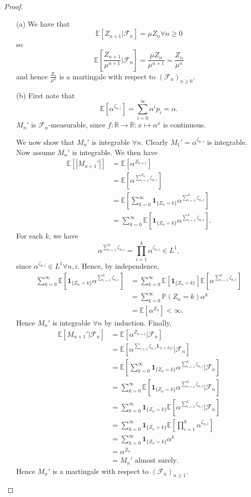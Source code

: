 \documentclass{article}
\begin{document}
\begin{proof}
\begin{enumerate}
    \item[(a)] We have that \[\mathbb{E}[Z_{n+1}|\mathcal{F}_n]=\mu Z_n\forall n\geq 0\] so \[\mathbb{E}\left[\frac{Z_{n+1}}{\mu^{n+1}}|\mathcal{F}_n\right]=\frac{\mu Z_n}{\mu^{n+1}}=\frac{Z_n}{\mu^n}\] and hence $\frac{Z_n}{\mu^n}$ is a martingale with respect to $(\mathcal{F}_n)_{n\geq0}$.
    \item[(b)] First note that \[\mathbb{E}[\alpha^{\zeta_{n,i}}]=\sum_{i=0}^\infty\alpha^ip_i=\alpha.\]$M_n'$ is $\mathcal{F}_n$-measurable, since $f:\mathbb{R}\to\mathbb{R}:x\mapsto\alpha^x$ is continuous.
    
    We now show that $M_n'$ is integrable $\forall n$. Clearly $M_1'=\alpha^{\zeta_{0,1}}$ is integrable. Now assume $M_n'$ is integrable. We then have
    \begin{align*}\mathbb{E}[|M_{n+1}'|]&=\mathbb{E}[\alpha^{Z_{n+1}}]\\&=\mathbb{E}[\alpha^{\sum_{i=1}^{Z_n}\zeta_{n,i}}]\\&=\mathbb{E}[\sum_{k=0}^\infty\mathbf{1}_{\{Z_n=k\}}\alpha^{\sum_{i=1}^k\zeta_{n,i}}]\\&=\sum_{k=0}^\infty\mathbb{E}[\mathbf{1}_{\{Z_n=k\}}\alpha^{\sum_{i=1}^k\zeta_{n,i}}].\end{align*} For each $k$, we have\[\alpha^{\sum_{i=1}^k\zeta_{n,i}}=\prod_{i=1}^k\alpha^{\zeta_{n,i}}\in L^1,\] since $\alpha^{\zeta_{n,i}}\in L^1\forall n,i$. Hence, by independence,\begin{align*}
    \sum_{k=0}^\infty\mathbb{E}[\mathbf{1}_{\{Z_n=k\}}\alpha^{\sum_{i=1}^k\zeta_{n,i}}]&=\sum_{k=0}^\infty\mathbb{E}[\mathbf{1}_{\{Z_n=k\}}]\mathbb{E}[\alpha^{\sum_{i=1}^k\zeta_{n,i}}]\\&=\sum_{k=0}^\infty\mathbb{P}(Z_n=k)\alpha^k\\&=\mathbb{E}[\alpha^{Z_n}]<\infty.
    \end{align*} Hence $M_n'$ is integrable $\forall n$ by induction.
    Finally,\begin{align*}\mathbb{E}[M_{n+1}'|\mathcal{F}_n]&=\mathbb{E}[\alpha^{Z_{n+1}}|\mathcal{F}_n]\\&=\mathbb{E}[\alpha^{\sum_{i\geq1}\zeta_{n,i}\mathbf{1}_{\{i\leq Z_n\}}}|\mathcal{F}_n]\\&=\mathbb{E}\left[\sum_{k=0}^\infty\mathbf{1}_{\{Z_n=k\}}\alpha^{\sum_{i=1}^k\zeta_{n,i}}|\mathcal{F}_n\right]\\&=\sum_{k=0}^\infty\mathbb{E}[\mathbf{1}_{\{Z_n=k\}}\alpha^{\sum_{i=1}^k\zeta_{n,i}}|\mathcal{F}_n]\\&=\sum_{k=0}^\infty\mathbf{1}_{\{Z_n=k\}}\mathbb{E}[\alpha^{\sum_{i=1}^k\zeta_{n,i}}|\mathcal{F}_n]\\&=\sum_{k=0}^\infty\mathbf{1}_{\{Z_n=k\}}\mathbb{E}[\prod_{i=1}^k\alpha^{\zeta_{n,i}}]\\&=\sum_{k=0}^\infty\mathbf{1}_{\{Z_n=k\}}\alpha^k\\&=\alpha^{Z_n}\\&=M_n'\text{ almost surely.}\end{align*}Hence $M_n'$ is a martingale with respect to $(\mathcal{F}_n)_{n\geq1}$.

\end{enumerate}
\end{proof}
\end{document}
